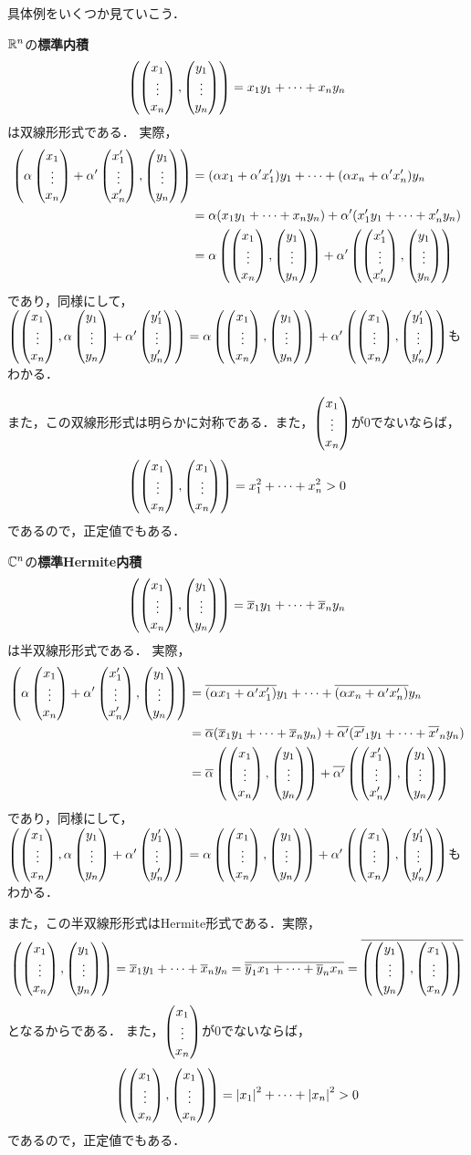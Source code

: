 具体例をいくつか見ていこう．
\begin{example}
$\RR^n$の\textbf{標準内積}
\[
  \left( \pmt{x_1 \\ \vdots \\ x_n}, \pmt{y_1 \\ \vdots \\ y_n} \right) = \lncmb{x}{y}{1}{n}{+}
\]
は双線形形式である．
実際，
\[
  \begin{aligned}
    \left( \alpha \idxvec{x}{1}{n} + \alpha' \idxvec{x'}{1}{n}, \idxvec{y}{1}{n} \right)
    &= (\alpha x_1 + \alpha' x'_1) y_1 + \dots + (\alpha x_n + \alpha' x'_n) y_n \\
    &= \alpha (\lncmb{x}{y}{1}{n}{+}) + \alpha' (\lncmb{x'}{y}{1}{n}{+}) \\
    &= \alpha \left( \idxvec{x}{1}{n}, \idxvec{y}{1}{n} \right) + \alpha' \left( \idxvec{x'}{1}{n}, \idxvec{y}{1}{n} \right) 
  \end{aligned}
\]
であり，同様にして，$\left( \idxvec{x}{1}{n},\alpha \idxvec{y}{1}{n} + \alpha' \idxvec{y'}{1}{n}\right) = \alpha \left( \idxvec{x}{1}{n}, \idxvec{y}{1}{n} \right) + \alpha' \left( \idxvec{x}{1}{n}, \idxvec{y'}{1}{n} \right)$もわかる．

また，この双線形形式は明らかに対称である．また，$\idxvec{x}{1}{n}$が0でないならば，
\[
  \left( \idxvec{x}{1}{n}, \idxvec{x}{1}{n} \right) = x_1^2 + \dots + x_n^2 > 0
\]
であるので，正定値でもある．
\end{example}
\begin{example}
  $\CC^n$の\textbf{標準Hermite内積}
  \[
    \left( \idxvec{x}{1}{n}, \idxvec{y}{1}{n} \right) 
    = \lncmb{\conj{x}}{y}{1}{n}{+}
  \]
  は半双線形形式である．
  実際，
  \[
    \begin{aligned}
      \left( \alpha \idxvec{x}{1}{n} + \alpha' \idxvec{x'}{1}{n}, \idxvec{y}{1}{n} \right)
      &= \conj{(\alpha x_1 + \alpha' x'_1)} y_1 + \dots + \conj{(\alpha x_n + \alpha' x'_n)} y_n \\
      &= \conj{\alpha} (\lncmb{\conj{x}}{y}{1}{n}{+}) + \conj{\alpha'} (\lncmb{\conj{x'}}{y}{1}{n}{+}) \\
      &= \conj{\alpha} \left( \idxvec{x}{1}{n}, \idxvec{y}{1}{n} \right) + \conj{\alpha'} \left( \idxvec{x'}{1}{n}, \idxvec{y}{1}{n} \right) 
    \end{aligned}
  \]
  であり，同様にして，$\left( \idxvec{x}{1}{n},\alpha \idxvec{y}{1}{n} + \alpha' \idxvec{y'}{1}{n}\right) = \alpha \left( \idxvec{x}{1}{n}, \idxvec{y}{1}{n} \right) + \alpha' \left( \idxvec{x}{1}{n}, \idxvec{y'}{1}{n} \right)$もわかる．
  
  また，この半双線形形式はHermite形式である．実際，
  \[
    \left( \idxvec{x}{1}{n}, \idxvec{y}{1}{n} \right) 
    = \lncmb{\conj{x}}{y}{1}{n}{+}
    = \conj{\lncmb{\conj{y}}{x}{1}{n}{+}}
    = \conj{\left( \idxvec{y}{1}{n}, \idxvec{x}{1}{n} \right)}
  \]
  となるからである．
  また，$\idxvec{x}{1}{n}$が0でないならば，
  \[
    \left( \idxvec{x}{1}{n}, \idxvec{x}{1}{n} \right) = \abs{x_1}^2 + \dots + \abs{x_n}^2 > 0
  \]
  であるので，正定値でもある．
\end{example}
